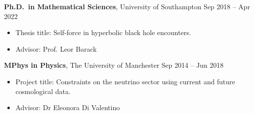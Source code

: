\documentclass[10.5pt, oneside]{article}   	%
\begin{document}
\textbf{Ph.D.\ in Mathematical Sciences}, University of Southampton \hfill Sep 2018 -- Apr 2022 \\
\vspace{-5mm} 
\begin{itemize}
\item Thesis title: Self-force in hyperbolic black hole encounters.
\item Advisor: Prof. Leor Barack
\end{itemize}
\textbf{MPhys in Physics}, The University of Manchester \hfill Sep 2014 -- Jun 2018 \\ 
\vspace{-5mm}
\begin{itemize}
\item Project title: Constraints on the neutrino sector using current and future cosmological data.
\item Advisor: Dr Eleonora Di Valentino
\end{itemize}

\end{document}
